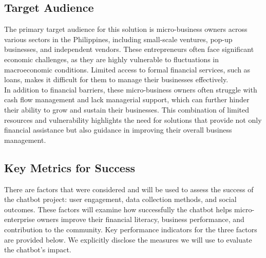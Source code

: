 \documentclass{article}
\begin{document}
\subsection{Target Audience}

The primary target audience for this solution is micro-business owners across various sectors in the Philippines, including small-scale ventures, pop-up businesses, and independent vendors. These entrepreneurs often face significant economic challenges, as they are highly vulnerable to fluctuations in macroeconomic conditions. Limited access to formal financial services, such as loans, makes it difficult for them to manage their businesses effectively.\\

In addition to financial barriers, these micro-business owners often struggle with cash flow management and lack managerial support, which can further hinder their ability to grow and sustain their businesses. This combination of limited resources and vulnerability highlights the need for solutions that provide not only financial assistance but also guidance in improving their overall business management.




\subsection{Key Metrics for Success}
There are factors that were considered and will be used to assess the success of the chatbot project: user engagement, data collection methods, and social outcomes. These factors will examine how successfully the chatbot helps micro-enterprise owners improve their financial literacy, business performance, and contribution to the community. Key performance indicators for the three factors are provided below. We explicitly disclose the measures we will use to evaluate the chatbot’s impact. \\
\end{document}
